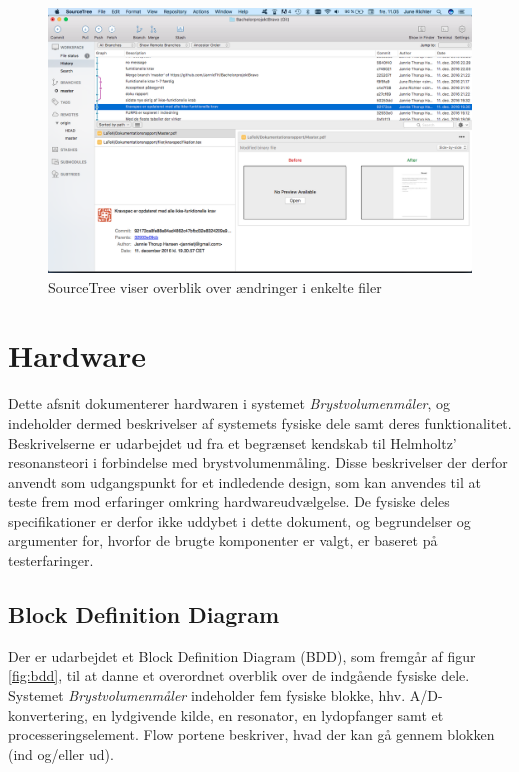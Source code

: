 \begin{figure}[htb]
\centering
\includegraphics[width=5in]{github.png}
\caption{SourceTree viser overblik over ændringer i enkelte filer}
\label{fig:git}	
\end{figure}


\section{Hardware}
Dette afsnit dokumenterer hardwaren i systemet \textit{Brystvolumenmåler}, og indeholder dermed beskrivelser af systemets fysiske dele samt deres funktionalitet. Beskrivelserne er udarbejdet ud fra et begrænset kendskab til Helmholtz' resonansteori i forbindelse med brystvolumenmåling. Disse beskrivelser der derfor anvendt som udgangspunkt for et indledende design, som kan anvendes til at teste frem mod erfaringer omkring hardwareudvælgelse. De fysiske deles specifikationer er derfor ikke uddybet i dette dokument, og begrundelser og argumenter for, hvorfor de brugte komponenter er valgt, er baseret på testerfaringer. 

\subsection{Block Definition Diagram}
Der er udarbejdet et Block Definition Diagram (BDD), som fremgår af figur \ref{fig:bdd}, til at danne et overordnet overblik over de indgående fysiske dele. Systemet \textit{Brystvolumenmåler} indeholder fem fysiske blokke, hhv. A/D-konvertering, en lydgivende kilde, en resonator, en lydopfanger samt et processeringselement. Flow portene beskriver, hvad der kan gå gennem blokken (ind og/eller ud).  
 
